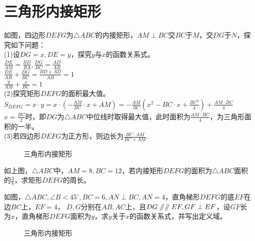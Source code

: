 \section{三角形内接矩形}
\begin{definition}
    如图，四边形$DEFG$为$\triangle ABC$的内接矩形，$AM\perp BC$交$BC$于$M$，交$DG$于$N$，探究如下问题：\\
    (1)设$DG=x,DE=y$，探究$y$与$x$的函数关系式。\\
    $\frac{DE}{AM}=\frac{BD}{BA},\frac{DG}{BC}=\frac{AD}{AB}$ \\
    $\frac{DE}{AH}+\frac{DG}{BC}=\frac{BD+AD}{AB}=1$ \\
    $\frac{y}{AM}+\frac{x}{BC}=1$ \\
    (2)探究矩形$DEFG$的面积最大值。\\
    $S_{DEFG}=x·y=x·(-\frac{AM}{BC}·x+AM)=-\frac{AM}{BC}(x^2-BC·x+\frac{BC^2}{4})+\frac{AM·BC}{4}$ \\
    $x=\frac{BC}{2}$时，即$DG$为$\triangle ABC$中位线时取得最大值，此时面积为$\frac{AM·BC}{4}$，为三角形面积的一半。\\
    (3)若四边形$DEFG$为正方形，则边长为$\frac{BC·AM}{BC+AM}.$ \\
\end{definition}
\begin{figure}[H]
    \centering
    \resizebox{4cm}{!}{}
    \caption{三角形内接矩形}
\end{figure}
\begin{problem}
如上图，$\triangle ABC$中，$AM=8,BC=12$，若内接矩形$DEFG$的面积为$\triangle ABC$面积的$\frac{3}{8}$，求矩形$DEFG$的周长。\\
\end{problem}
\begin{problem}
如图，$\triangle ABC,\angle B<45^\circ,BC=6,AN\perp BC,AN=4$，直角梯形$DEFG$的底$EF$在边$BC$上，$EF=4$，
$D,G$分别在$AB,AC$上，且$DG\mathrel{/\mkern-5mu/} \mathrel{/\mkern-5mu/} EF,GF\perp EF$，设$GF$长为$x$，直角梯形$DEFG$面积为$y$，求$y$关于$x$的函数关系式，并写出定义域。\\
\end{problem}
\begin{figure}[H]
    \centering
    \resizebox{4cm}{!}{}
    \caption{三角形内接矩形}
\end{figure}
\clearpage
